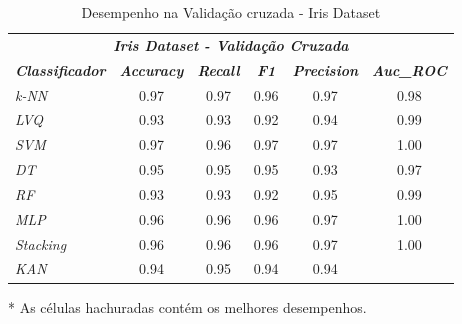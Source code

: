 \documentclass[journal]{IEEEtran}
\begin{document}
\begin{table}[h!]
	\caption{Desempenho na Validação cruzada - Iris Dataset}
	\label{tab:3}
	\begin{threeparttable}
		\begin{tabular}{lccccc}
			\hline
			\multicolumn{6}{c}{\textit{\textbf{Iris Dataset - Validação Cruzada}}}                                                                                                                               \\
			\multicolumn{1}{l|}{\textit{\textbf{Classificador}}} & \textit{\textbf{Accuracy}} & \textit{\textbf{Recall}}  & \textit{\textbf{F1}}      & \textit{\textbf{Precision}} & \textit{\textbf{Auc\_ROC}} \\ \hline
			\multicolumn{1}{l|}{\textit{k-NN}}                   & \cellcolor{lightgray}0.97  & \cellcolor{lightgray}0.97 & 0.96                      & \cellcolor{lightgray}0.97   & 0.98                       \\
			\multicolumn{1}{l|}{\textit{LVQ}}                    & 0.93                       & 0.93                      & 0.92                      & 0.94                        & 0.99                       \\
			\multicolumn{1}{l|}{\textit{SVM}}                    & \cellcolor{lightgray}0.97  & 0.96                      & \cellcolor{lightgray}0.97 & \cellcolor{lightgray}0.97   & \cellcolor{lightgray}1.00  \\
			\multicolumn{1}{l|}{\textit{DT}}                     & 0.95                       & 0.95                      & 0.95                      & 0.93                        & 0.97                       \\
			\multicolumn{1}{l|}{\textit{RF}}                     & 0.93                       & 0.93                      & 0.92                      & 0.95                        & 0.99                       \\
			\multicolumn{1}{l|}{\textit{MLP}}                    & 0.96                       & 0.96                      & 0.96                      & \cellcolor{lightgray}0.97   & \cellcolor{lightgray}1.00  \\
			\multicolumn{1}{l|}{\textit{Stacking}}               & 0.96                       & 0.96                      & 0.96                      & \cellcolor{lightgray}0.97   & \cellcolor{lightgray}1.00  \\
			\multicolumn{1}{l|}{\textit{KAN}}                    & 0.94                       & 0.95                      & 0.94                      & 0.94                        &                            \\
			\hline
		\end{tabular}
		\begin{tablenotes}\footnotesize
			\item[*] As células hachuradas contém os melhores desempenhos.
		\end{tablenotes}
	\end{threeparttable}
\end{table}
\end{document}
